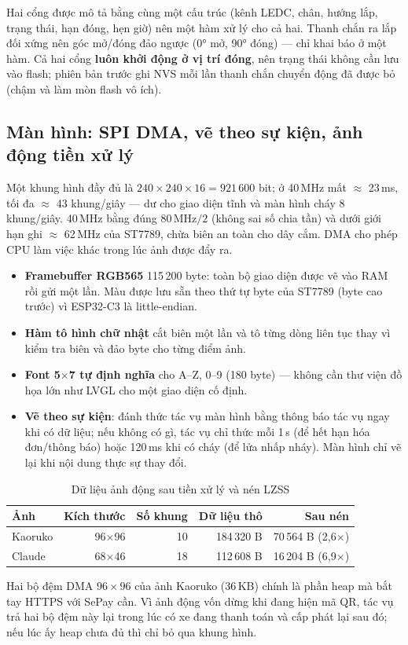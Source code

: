 Hai cổng được mô tả bằng cùng một cấu trúc (kênh LEDC, chân, hướng lắp, trạng thái,
hạn đóng, hẹn giờ) nên một hàm xử lý cho cả hai. Thanh chắn ra lắp đối xứng nên góc
mở/đóng đảo ngược (0° mở, 90° đóng) — chỉ khai báo ở một hàm. Cả hai cổng \textbf{luôn
khởi động ở vị trí đóng}, nên trạng thái không cần lưu vào flash; phiên bản trước ghi
NVS mỗi lần thanh chắn chuyển động đã được bỏ (chậm và làm mòn flash vô ích).

\subsection{Màn hình: SPI DMA, vẽ theo sự kiện, ảnh động tiền xử lý}
\begin{lydo}
Một khung hình đầy đủ là $240\times240\times16 = 921\,600$ bit; ở 40\,MHz mất
$\approx$ 23\,ms, tối đa $\approx$ 43 khung/giây — dư cho giao diện tĩnh và màn hình cháy
8 khung/giây. 40\,MHz bằng đúng $80\,\text{MHz}/2$ (không sai số chia tần) và dưới giới
hạn ghi $\approx$ 62\,MHz của ST7789, chừa biên an toàn cho dây cắm. DMA cho phép CPU
làm việc khác trong lúc ảnh được đẩy ra.
\end{lydo}

\begin{itemize}
\item \textbf{Framebuffer RGB565} 115\,200 byte: toàn bộ giao diện được vẽ vào RAM rồi gửi
  một lần. Màu được lưu sẵn theo thứ tự byte của ST7789 (byte cao trước) vì
  ESP32-C3 là little-endian.
\item \textbf{Hàm tô hình chữ nhật} cắt biên một lần và tô từng dòng liên tục thay vì
  kiểm tra biên và đảo byte cho từng điểm ảnh.
\item \textbf{Font 5$\times$7 tự định nghĩa} cho A–Z, 0–9 (180 byte) — không cần thư viện
  đồ họa lớn như LVGL cho một giao diện cố định.
\item \textbf{Vẽ theo sự kiện}:  đánh thức tác vụ màn hình bằng thông
  báo tác vụ ngay khi có dữ liệu; nếu không có gì, tác vụ chỉ thức mỗi 1\,s (để hết hạn
  hóa đơn/thông báo) hoặc 120\,ms khi có cháy (để lửa nhấp nháy). Màn hình chỉ vẽ lại
  khi nội dung thực sự thay đổi.
\end{itemize}

\begin{table}[H]
\centering\small
\caption{Dữ liệu ảnh động sau tiền xử lý và nén LZSS}\label{tab:lzss}
\begin{tabular}{@{}lrrrr@{}}
\toprule
\textbf{Ảnh} & \textbf{Kích thước} & \textbf{Số khung} & \textbf{Dữ liệu thô} & \textbf{Sau nén} \\ \midrule
Kaoruko & 96$\times$96 & 10 & 184\,320 B & 70\,564 B (2,6$\times$) \\
Claude & 68$\times$46 & 18 & 112\,608 B & 16\,204 B (6,9$\times$) \\
\bottomrule
\end{tabular}
\end{table}
\noindent Hai bộ đệm DMA $96\times96$ của ảnh Kaoruko (36\,KB) chính là phần heap mà bắt tay HTTPS
với SePay cần. Vì ảnh động vốn dừng khi đang hiện mã QR, tác vụ  trả hai bộ đệm
này lại trong lúc có xe đang thanh toán và cấp phát lại sau đó; nếu lúc ấy heap chưa đủ thì chỉ bỏ
qua khung hình.

